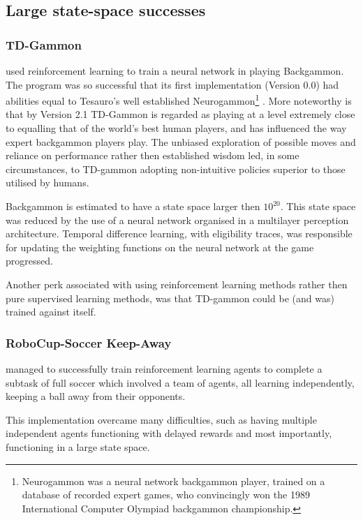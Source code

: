 \documentclass{rucsthesis}
\begin{document}
\subsection{Large state-space successes}

\subsubsection{TD-Gammon}

 \cite{tdgammon} used reinforcement learning to train a neural network in playing Backgammon. The program was so successful that its first implementation (Version 0.0) had abilities equal to Tesauro's well established Neurogammon\footnote{Neurogammon was a neural network backgammon player, trained on a database of recorded expert games, who convincingly won the 1989 International Computer Olympiad backgammon championship.} \citep{tdgammon}.  More noteworthy is that by Version 2.1 TD-Gammon is regarded as playing at a level extremely close to equalling that of the world's best human players, and has influenced the way expert backgammon players play\citep{tdgammon}. The unbiased exploration of possible moves and reliance on performance rather then established wisdom led, in some circumstances, to TD-gammon adopting non-intuitive policies superior to those utilised by humans\citep{tdgammon}.

Backgammon is estimated to have a state space larger then $10^{20}$. This state space was reduced by the use of a neural network organised in a multilayer perception architecture. Temporal difference learning, with eligibility traces, was responsible for updating the weighting functions on the neural network at the game progressed. 

Another perk associated with using reinforcement learning methods rather then pure supervised learning methods, was that TD-gammon could be (and was) trained against itself\citep{tdgammon}.

\subsubsection{RoboCup-Soccer Keep-Away}

\cite{keepaway} managed to successfully train reinforcement learning agents to complete a subtask of full soccer which involved a team of agents, all learning independently, keeping a ball away from their opponents. 

This implementation overcame many difficulties, such as having multiple independent agents functioning with delayed rewards and most importantly, functioning in a large state space. 
\end{document}
